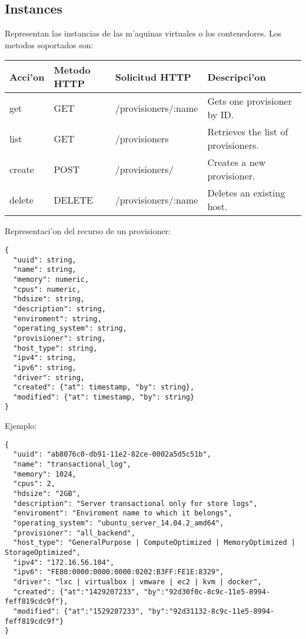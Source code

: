 \subsection{Instances}
Representan las instancias de las m'aquinas virtuales o los contenedores. Los metodos soportados son:

\begin{center}
 \begin{tabular}{| l | l | l | l |}
 \hline
  \rowcolor{blueapi}
  \textbf{Acci'on} & \textbf{Metodo HTTP} & \textbf{Solicitud HTTP} & \textbf{Descripci'on} \\ [0.5ex] 
  \hline\hline
  get & GET & /provisioners/:name & Gets one provisioner by ID. \\
  \hline
  list & GET & /provisioners & Retrieves the list of provisioners. \\
  \hline  
  create & POST & /provisioners/ & Creates a new provisioner. \\
  \hline
  delete & DELETE & /provisioners/:name & Deletes an existing host. \\ [1ex] 
  \hline
\end{tabular}
\end{center}

Representaci'on del recurso de un provisioner:

\medskip
\begin{lstlisting}[style=json]
{
  "uuid": string,
  "name": string,
  "memory": numeric,
  "cpus": numeric,
  "hdsize": string,
  "description": string, 
  "enviroment": string,
  "operating_system": string,
  "provisioner": string,
  "host_type": string,
  "ipv4": string,
  "ipv6": string,
  "driver": string,
  "created": {"at": timestamp, "by": string},
  "modified": {"at": timestamp, "by": string}
}
\end{lstlisting}

Ejemplo:

\medskip
\begin{lstlisting}[style=json]
{
  "uuid": "ab8076c0-db91-11e2-82ce-0002a5d5c51b",
  "name": "transactional_log",
  "memory": 1024,
  "cpus": 2,
  "hdsize": "2GB",
  "description": "Server transactional only for store logs", 
  "enviroment": "Enviroment name to which it belongs",
  "operating_system": "ubuntu_server_14.04.2_amd64",
  "provisioner": "all_backend",
  "host_type": "GeneralPurpose | ComputeOptimized | MemoryOptimized | StorageOptimized",
  "ipv4": "172.16.56.104",
  "ipv6": "FE80:0000:0000:0000:0202:B3FF:FE1E:8329",
  "driver": "lxc | virtualbox | vmware | ec2 | kvm | docker",
  "created": {"at":"1429207233", "by":"92d30f0c-8c9c-11e5-8994-feff819cdc9f"},
  "modified": {"at":"1529207233", "by":"92d31132-8c9c-11e5-8994-feff819cdc9f"}
}
\end{lstlisting}

